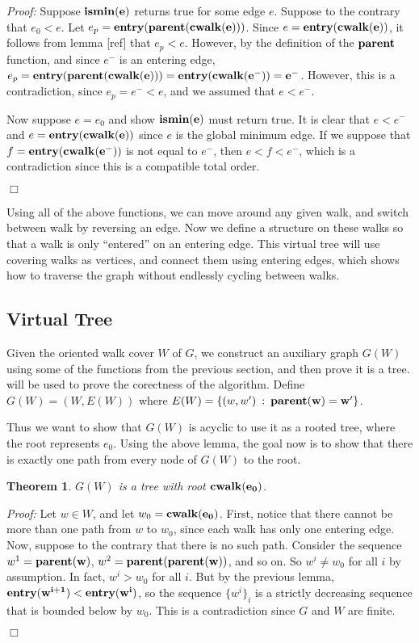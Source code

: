 \documentclass[11pt]{article}
\newcommand{\cwalk}{\bf cwalk}
\newcommand{\entry}{\bf entry}
\newcommand{\parent}{\bf parent}
\newcommand{\ismin}{\bf ismin}
\newtheorem{theorem}{Theorem}[section]
\begin{document}
\noindent\emph{Proof: }  Suppose $\ismin(e)$ returns true for some edge $e$.  Suppose to the contrary 
that $e_0 < e$.  Let $e_p = \entry(\parent(\cwalk(e)))$.  Since $e=\entry(\cwalk(e))$, it follows 
from lemma [ref] that $e_p < e$.  However, by the definition of the $\parent$ function, and since $e^-$ is 
an entering edge, $e_p=\entry(\parent(\cwalk(e)))=\entry(\cwalk(e^-))=e^-$.  However, this is a contradiction, since 
$e_p=e^- < e$, and we assumed that $e<e^-$.  
 
Now suppose $e=e_0$ and show $\ismin(e)$ must return true.  
It is clear that $e<e^-$ and $e = \entry(\cwalk(e))$ 
since $e$ is the global minimum edge.  If we suppose that $f=\entry(\cwalk(e^-))$ is not equal to 
$e^-$, then $e < f < e^-$, which is a contradiction since this is a compatible total order. \begin{flushright} $\Box$\end{flushright} 


Using all of the above functions, we can move around any given walk, and switch between walk by 
reversing an edge.  Now we define a structure on these walks so that a walk is only ``entered'' on an 
entering edge.  This virtual tree will use covering walks as vertices, and connect them using entering 
edges, which shows how to traverse the graph without endlessly cycling between walks.


\subsection{Virtual Tree}
\label{ss-virtualtree}

Given the oriented walk cover $W$ of $G$, we construct an auxiliary graph $G(W)$ using some of the functions 
from the previous section, and then prove it is a tree. will be used to prove the corectness of 
the algorithm.  
Define $G(W)=(W,E(W))$ where $E(W) = \{(w,w') \: : \: \parent(w) = w' \}$. 


Thus we want to show that $G(W)$ is acyclic to use it as a rooted tree, where the root represents
 $e_0$.  Using the above lemma, the goal now is to show that there is exactly one path from 
every node of $G(W)$ to the root.  

\begin{theorem}
\label{thm-tree}
$G(W)$ is a tree with root $\cwalk(e_0)$. 
\end{theorem}

\noindent\emph{Proof: }
Let $w\in W$, and let $w_0 = \cwalk(e_0)$.  First, notice that there cannot be more than one path from 
$w$ to $w_0$, since each walk has only one entering edge.  Now, suppose to the contrary that there is no such 
path.  Consider the sequence $w^1 = \parent(w)$, $w^2 = \parent(\parent(w))$, and so on.  So $w^i \ne w_0$ for 
all $i$ by assumption.  In fact, $w^i > w_0$ for all $i$.  But by the previous lemma, 
$\entry(w^{i+1}) < \entry(w^i)$, so the sequence $\{w^i \}_i$ is 
a strictly decreasing sequence that is bounded below by $w_0$.  
This is a contradiction since $G$ and $W$ are finite.  \begin{flushright} $\Box$\end{flushright} 
\end{document}
